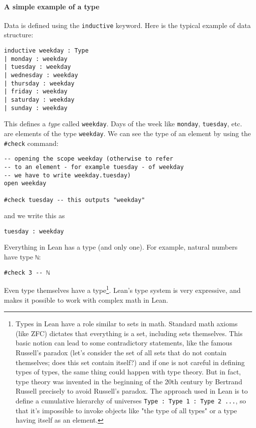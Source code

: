 \documentclass{book}
\theoremstyle{definition}
\theoremstyle{remark}
\theoremstyle{plain}
\begin{document}
\paragraph{A simple example of a type}
Data is defined using the \lstinline{inductive} keyword.
Here is the typical example of data structure:
\begin{lstlisting}
inductive weekday : Type
| monday : weekday
| tuesday : weekday
| wednesday : weekday
| thursday : weekday
| friday : weekday
| saturday : weekday
| sunday : weekday
\end{lstlisting}
This defines a \textit{type} called \lstinline{weekday}.
Days of the week like \lstinline{monday}, \lstinline{tuesday}, etc. are elements of the type \lstinline{weekday}.
We can see the type of an element by using the \lstinline{#check} command:
\begin{lstlisting}
-- opening the scope weekday (otherwise to refer
-- to an element - for example tuesday - of weekday
-- we have to write weekday.tuesday)
open weekday

#check tuesday -- this outputs "weekday"
\end{lstlisting}
and we write this as
\begin{center}\begin{lstlisting}
tuesday : weekday
\end{lstlisting}\end{center}
Everything in Lean has a type (and only one). For example, natural numbers have type \lstinline{ℕ}:
\begin{lstlisting}
#check 3 -- ℕ
\end{lstlisting}
Even type themselves have a type\footnote{Types in Lean have a role similar to sets in math.
Standard math axioms (like ZFC) dictates that everything is a set, including sets themselves.
This basic notion can lead to some contradictory statements, like the famous Russell's paradox
(let's consider the set of all sets that do not contain themselves; does this set contain itself?)
and if one is not careful in defining types of types, the same thing could happen with type theory.
But in fact, type theory was invented in the beginning of the 20th century by Bertrand Russell precisely to avoid Russell's paradox.
The approach used in Lean is to define a cumulative hierarchy of universes \lstinline{Type : Type 1 : Type 2 ...},
so that it's impossible to invoke objects like "the type of all types" or a type having itself as an element.}.
Lean's type system is very expressive, and makes it possible to work with complex math in Lean.
\end{document}
